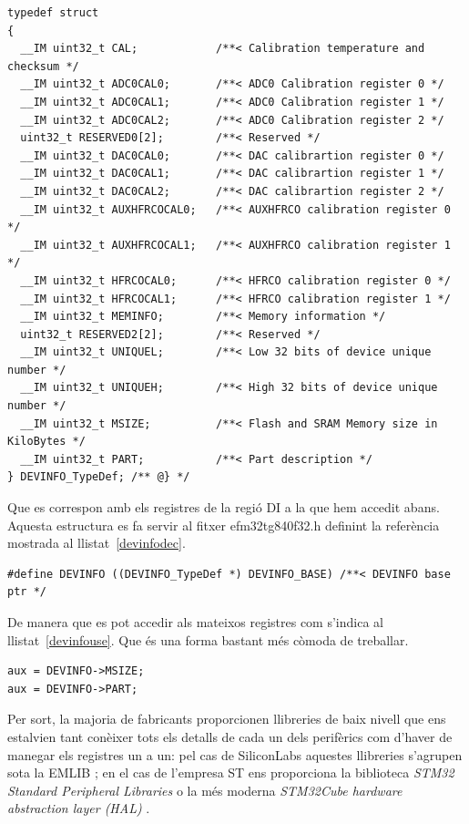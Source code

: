 \begin{lstlisting}[label=devinfo,caption={Exemple de definició d'estructura per accedir a memòria},style=customc]
typedef struct
{
  __IM uint32_t CAL;            /**< Calibration temperature and checksum */
  __IM uint32_t ADC0CAL0;       /**< ADC0 Calibration register 0 */
  __IM uint32_t ADC0CAL1;       /**< ADC0 Calibration register 1 */
  __IM uint32_t ADC0CAL2;       /**< ADC0 Calibration register 2 */
  uint32_t RESERVED0[2];        /**< Reserved */
  __IM uint32_t DAC0CAL0;       /**< DAC calibrartion register 0 */
  __IM uint32_t DAC0CAL1;       /**< DAC calibrartion register 1 */
  __IM uint32_t DAC0CAL2;       /**< DAC calibrartion register 2 */
  __IM uint32_t AUXHFRCOCAL0;   /**< AUXHFRCO calibration register 0 */
  __IM uint32_t AUXHFRCOCAL1;   /**< AUXHFRCO calibration register 1 */
  __IM uint32_t HFRCOCAL0;      /**< HFRCO calibration register 0 */
  __IM uint32_t HFRCOCAL1;      /**< HFRCO calibration register 1 */
  __IM uint32_t MEMINFO;        /**< Memory information */
  uint32_t RESERVED2[2];        /**< Reserved */
  __IM uint32_t UNIQUEL;        /**< Low 32 bits of device unique number */
  __IM uint32_t UNIQUEH;        /**< High 32 bits of device unique number */
  __IM uint32_t MSIZE;          /**< Flash and SRAM Memory size in KiloBytes */
  __IM uint32_t PART;           /**< Part description */
} DEVINFO_TypeDef; /** @} */
\end{lstlisting}

Que es correspon amb els registres de la regió DI a la que hem accedit abans. Aquesta estructura es fa servir al fitxer efm32tg840f32.h definint la referència mostrada al llistat~\ref {devinfodec}.

\begin{lstlisting}[label=devinfodec,caption={Declaració d'una variable d'accés a la memòria estructurada},style=customc]
#define DEVINFO ((DEVINFO_TypeDef *) DEVINFO_BASE) /**< DEVINFO base ptr */
\end{lstlisting}

De manera que es pot accedir als mateixos registres com s'indica al
llistat~\ref {devinfouse}. Que és una forma bastant més còmoda de treballar.

\begin{lstlisting}[label=devinfouse,caption={Ús de l'estructura d'accés},style=customc]
aux = DEVINFO->MSIZE;
aux = DEVINFO->PART;
\end{lstlisting}

Per sort, la majoria de fabricants proporcionen llibreries de baix nivell que ens estalvien tant conèixer tots els detalls de cada un dels perifèrics com d'haver de manegar els registres un a un: pel cas de SiliconLabs aquestes llibreries s'agrupen sota la EMLIB \cite{EMLIB}; en el cas de l'empresa ST ens proporciona la biblioteca {\em STM32 Standard Peripheral Libraries} \cite{STM32Lib} o la més moderna {\em  STM32Cube hardware abstraction layer (HAL)} \cite{STM32CubeHAL}.

